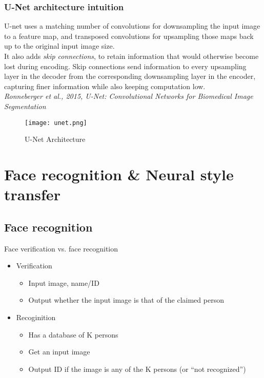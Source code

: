 \subsubsection{U-Net architecture intuition}
U-net uses a matching number of convolutions for downsampling the input image to a feature map, and transposed convolutions for upsampling those maps back up to the original input image size.\\
It also adds \emph{skip connections}, to retain information that would otherwise become lost during encoding. Skip connections send information to every upsampling layer in the decoder from the corresponding downsampling layer in the encoder, capturing finer information while also keeping computation low.
\\
\textit{Ronneberger et al., 2015, U-Net: Convolutional Networks for Biomedical Image Segmentation}
\begin{figure}[h]
    \centering
    \texttt{[image: unet.png]}
    \caption{U-Net Architecture}
    \label{fig:unet}
\end{figure}


\section{Face recognition \& Neural style transfer}
%
\subsection{Face recognition}
Face verification vs. face recognition
\begin{itemize}
\item
Verification
    \begin{itemize}
    \item
    Input image, name/ID
    \item
    Output whether the input image is that of the claimed person
    \end{itemize}
\item
Recoginition
    \begin{itemize}
    \item
    Has a database of K persons
    \item
    Get an input image
    \item
    Output ID if the image is any of the K persons (or ``not recognized'')
    \end{itemize}
\end{itemize}

